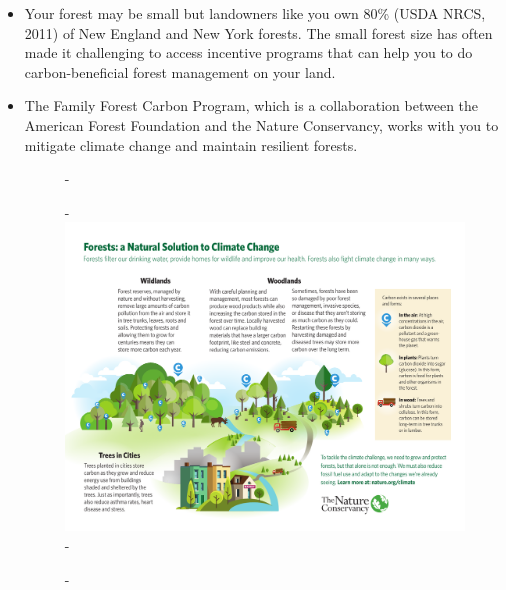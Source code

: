 \documentclass{article}\usepackage[]{graphicx}\usepackage[]{color}
\begin{document}
  \begin{itemize}
  \item Your forest may be small but landowners like you own 80\% (USDA NRCS, 2011) of New England and New York forests. The small forest size has often made it challenging to access incentive programs that can help you to do carbon-beneficial forest management on your land.
  
  \item The Family Forest Carbon Program, which is a collaboration between the American Forest Foundation and the Nature Conservancy, works with you to mitigate climate change and maintain resilient forests. 

  {\begin{figure} [H]
  -\begin{center}
  -\includegraphics[width=16cm]{..//figures/TNC-forestC.pdf}\label{fig:carbon}
  -\end{center}
  -\end{figure}}

  
   
  \end{itemize}
\end{document}
